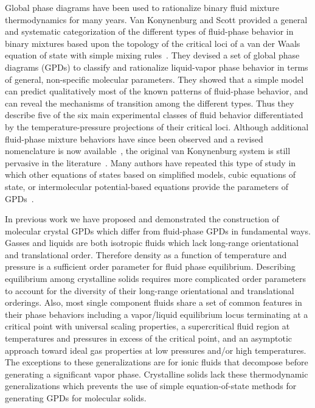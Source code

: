 \documentclass[preprint]{iucr}              %
\begin{document}
Global phase diagrams have been used to rationalize binary fluid mixture
thermodynamics for many years.  Van Konynenburg and Scott provided a general and
systematic categorization of the different types of fluid-phase behavior in
binary mixtures based upon the topology of the critical loci of a van der Waals
equation of state with simple mixing rules~\cite{vanKonynenburg80}.  They
devised a set of global phase diagrams (GPDs) to classify and rationalize
liquid-vapor phase behavior in terms of general, non-specific molecular
parameters.  They showed that a simple model can predict qualitatively most of
the known patterns of fluid-phase behavior, and can reveal the mechanisms of
transition among the different types.  Thus they describe five of the six main
experimental classes of fluid behavior differentiated by the
temperature-pressure projections of their critical loci.  Although additional
fluid-phase mixture behaviors have since been observed and a revised
nomenclature is now available~\cite{Bolz98}, the original van Konynenburg system
is still pervasive in the
literature~\cite{AparicioMartinez07a,AparicioMartinez07b,Cismondi07}. Many
authors have repeated this type of study in which other equations of states
based on simplified models, cubic equations of state, or intermolecular
potential-based equations provide the parameters of
GPDs~\cite{Polishuk00,Polishuk02,vanPelt95}.
 
In previous work we have proposed and demonstrated the construction of molecular
crystal GPDs which differ from fluid-phase GPDs in fundamental ways.  Gasses and
liquids are both isotropic fluids which lack long-range orientational and
translational order.  Therefore density as a function of temperature and
pressure is a sufficient order parameter for fluid phase equilibrium. 
Describing equilibrium among crystalline solids requires more complicated order
parameters to account for the diversity of their long-range orientational and
translational orderings.  Also, most single component fluids share a set of
common features in their phase behaviors including a vapor/liquid equilibrium
locus terminating at a critical point with universal scaling properties, a
supercritical fluid region at temperatures and pressures in excess of the
critical point, and an asymptotic approach toward ideal gas properties at low
pressures and/or high temperatures.  The exceptions to these generalizations are
for ionic fluids that decompose before generating a significant vapor phase. 
Crystalline solids lack these thermodynamic generalizations which prevents the
use of simple equation-of-state methods for generating GPDs for molecular
solids.
\end{document}
